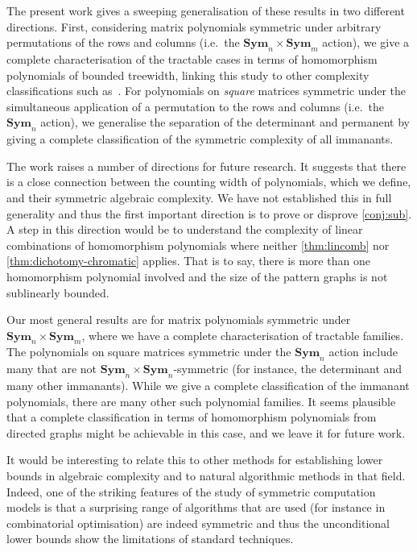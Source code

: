 \documentclass[10pt,a4paper]{article}
\theoremstyle{definition}
\theoremstyle{plain}
\theoremstyle{remark}
\newcommand{\Sym}{\mathbf{Sym}}
\begin{document}
The present work gives a sweeping generalisation of these results in two different directions.  First, considering matrix polynomials symmetric under arbitrary permutations of the rows and columns (i.e.\ the $\Sym_n \times \Sym_m$ action), we give a complete characterisation of the tractable cases in terms of homomorphism polynomials of bounded treewidth, linking this study to other complexity classifications such as~\cite{curticapean_homomorphisms_2017}.  For polynomials on \emph{square} matrices symmetric under the simultaneous application of a permutation to the rows and columns (i.e.\ the $\Sym_n$ action), we generalise the separation of the determinant and permanent by giving a complete classification of the symmetric complexity of all immanants.

The work raises a number of directions for future research.  It suggests that there is a close connection between the counting width of polynomials, which we define, and their symmetric algebraic complexity. We have not established this in full generality and thus the first important direction is to prove or disprove \cref{conj:sub}. A step in this direction would be to understand the complexity of linear combinations of homomorphism polynomials where neither \cref{thm:lincomb} nor \cref{thm:dichotomy-chromatic} applies. 
That is to say, there is more than one homomorphism polynomial involved and the size of the pattern graphs is not sublinearly bounded.

Our most general results are for matrix polynomials symmetric under $\Sym_n \times \Sym_m$, where we have a complete characterisation of tractable families. The polynomials on square matrices symmetric under the $\Sym_n$ action include many that are not $\Sym_n \times \Sym_n$-symmetric (for instance, the determinant and many other immanants).  While we give a complete classification of the immanant polynomials, there are many other such polynomial families. It seems plausible that a complete classification in terms of homomorphism polynomials from directed graphs might be achievable in this case, and we leave it for future work.

It would be interesting to relate this to other methods for
establishing lower bounds in algebraic complexity and to natural
algorithmic methods in that field.  Indeed, one of the striking
features of the study of symmetric computation models is that a
surprising range of algorithms that are used (for instance in
combinatorial optimisation) are indeed symmetric and thus the
unconditional lower bounds show the limitations of standard
techniques.
\end{document}
